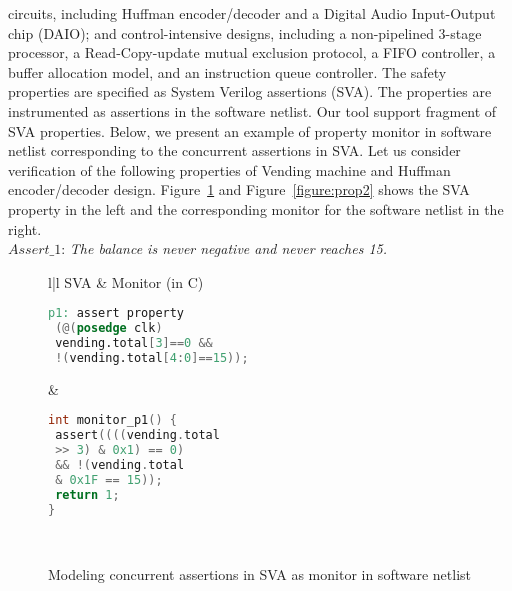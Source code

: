 circuits, including Huffman encoder/decoder and a Digital Audio
Input-Output chip (DAIO); and control-intensive designs,
including a non-pipelined 3-stage processor, a Read-Copy-update
mutual exclusion protocol, a FIFO controller, a buffer allocation model,
and an instruction queue controller.   
%
%
The safety properties are specified as System Verilog assertions (SVA).
The properties are instrumented as assertions in the software netlist. 
Our tool support fragment of SVA properties. Below, we present
an example of property monitor in software netlist corresponding 
to the concurrent assertions in SVA.  Let us consider verification 
of the following properties of Vending machine and Huffman 
encoder/decoder design. Figure~\ref{figure:prop1} and 
Figure~\ref{figure:prop2} shows the SVA property in the left and 
the corresponding monitor for the software netlist in the right. \\
$Assert\_1$: {\em The balance is never negative and never reaches 15.} 
\vspace{-3mm}
\begin{figure}[htbp]
\scriptsize
\begin{tabular}{l|l}
\hline
SVA & Monitor (in C)
\\
\hline
\begin{lstlisting}[mathescape=true,language=Verilog]
p1: assert property 
 (@(posedge clk) 
 vending.total[3]==0 && 
 !(vending.total[4:0]==15)); 
\end{lstlisting}
&
\begin{lstlisting}[mathescape=true,language=C]
int monitor_p1() {
 assert((((vending.total 
 >> 3) & 0x1) == 0) 
 && !(vending.total 
 & 0x1F == 15));
 return 1;
}
\end{lstlisting} \\
\hline
\end{tabular}
\caption{Modeling concurrent assertions in SVA as monitor in software netlist}
\label{figure:prop1}
\end{figure}
%

